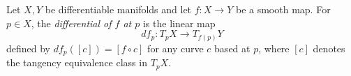 Let $X, Y$ be differentiable manifolds and let $f \colon X \to Y$ be a smooth map. For $p \in X$, the \emph{differential of $f$ at $p$} is the linear map
$$
df_p \colon T_p X \to T_{f(p)} Y
$$
defined by $df_p([c]) = [f \circ c]$ for any curve $c$ based at $p$, where $[c]$ denotes the tangency equivalence class in $T_p X$.
